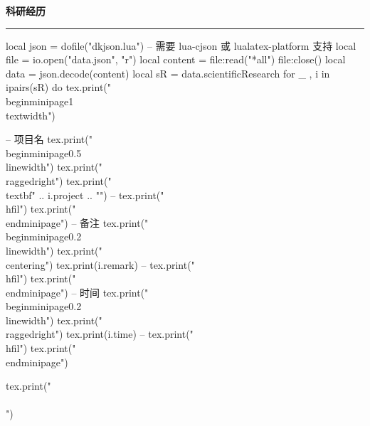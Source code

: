 \documentclass[10pt, a4paper, oneside]{ctexart}
\begin{document}
\ifdefined\scientificResearch
\begin{minipage}{1\textwidth}
    \large{\textbf{科研经历}}
\end{minipage}
\rule{\linewidth}{\lineSize}
\begin{center}
    \begin{minipage}{0.9\textwidth}
        \begin{luacode}
            local json = dofile("dkjson.lua")  -- 需要 lua-cjson 或 lualatex-platform 支持
            local file = io.open("data.json", "r")
            local content = file:read("*all")
            file:close()
            local data = json.decode(content)
            local sR = data.scientificResearch
            for _ , i in ipairs(sR) do
                tex.print("\\begin{minipage}{1\\textwidth}")

                -- 项目名
                tex.print("\\begin{minipage}{0.5\\linewidth}")
                tex.print("\\raggedright")
                tex.print("\\textbf{" .. i.project .. "}")
                -- tex.print("\\hfil")
                tex.print("\\end{minipage}")
                -- 备注
                tex.print("\\begin{minipage}{0.2\\linewidth}")
                tex.print("\\centering")
                tex.print(i.remark)
                -- tex.print("\\hfil")
                tex.print("\\end{minipage}")
                -- 时间
                tex.print("\\begin{minipage}{0.2\\linewidth}")
                tex.print("\\raggedright")
                tex.print(i.time)
                -- tex.print("\\hfil")
                tex.print("\\end{minipage}")

                tex.print("\\\\[0.8em]")


\end{luacode}
\end{minipage}
\end{center}
\end{document}
